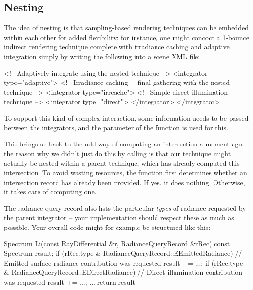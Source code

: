 \subsection{Nesting}
The idea of nesting is that sampling-based rendering techniques can be
embedded within each other for added flexibility: for instance, one
might concoct a  1-bounce indirect rendering technique complete with
irradiance caching and adaptive integration simply by writing the following
into a scene XML file:
\begin{xml}
<!-- Adaptively integrate using the nested technique -->
<integrator type="adaptive">
    <!-- Irradiance caching + final gathering with the nested technique -->
    <integrator type="irrcache">
        <!-- Simple direct illumination technique -->
        <integrator type="direct">
    </integrator>
</integrator>
\end{xml}
To support this kind of complex interaction, some information needs to be passed between the
integrators, and the  parameter of the function
 is used for this.

This brings us back to the odd way of computing an intersection a moment ago:
the reason why we didn't just do this by calling
 is that our technique might actually be nested
within a parent technique, which has already computed this intersection.
To avoid wasting resources, the function  first
determines whether an intersection record has already been provided.
If yes, it does nothing. Otherwise, it takes care of computing one.

The radiance query record also lists the particular \emph{types} of radiance requested
by the parent integrator -- your implementation should respect these as much
as possible. Your overall code might for example be structured like this:

\begin{cpp}
   Spectrum Li(const RayDifferential &r, RadianceQueryRecord &rRec) const {
      Spectrum result;
      if (rRec.type & RadianceQueryRecord::EEmittedRadiance) {
         // Emitted surface radiance contribution was requested
         result += ...;
      }
      if (rRec.type & RadianceQueryRecord::EDirectRadiance) {
         // Direct illumination contribution was requested
         result += ...;
      }
      ...
      return result;
   }
\end{cpp}

